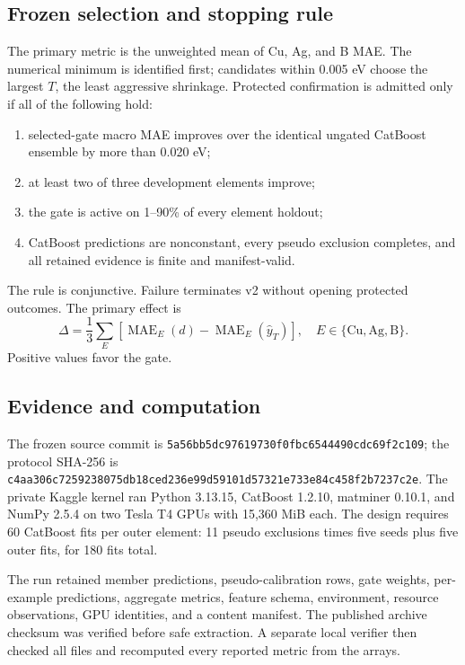 \documentclass[11pt]{article}
\begin{document}
\subsection{Frozen selection and stopping rule}
The primary metric is the unweighted mean of Cu, Ag, and B MAE. The numerical
minimum is identified first; candidates within 0.005 eV choose the largest
$T$, the least aggressive shrinkage. Protected confirmation is admitted only if
all of the following hold:
\begin{enumerate}
  \item selected-gate macro MAE improves over the identical ungated CatBoost
        ensemble by more than 0.020 eV;
  \item at least two of three development elements improve;
  \item the gate is active on 1--90\% of every element holdout;
  \item CatBoost predictions are nonconstant, every pseudo exclusion completes,
        and all retained evidence is finite and manifest-valid.
\end{enumerate}
The rule is conjunctive. Failure terminates v2 without opening protected
outcomes. The primary effect is
\begin{equation}
 \Delta = \frac{1}{3}\sum_E
 \left[\operatorname{MAE}_{E}(d)-\operatorname{MAE}_{E}(\widehat y_T)\right],
 \quad E\in\{\mathrm{Cu},\mathrm{Ag},\mathrm{B}\}.
\end{equation}
Positive values favor the gate.

\subsection{Evidence and computation}
The frozen source commit is
\texttt{5a56bb5d\allowbreak{}c9761973\allowbreak{}0f0fbc65\allowbreak{}44490cdc\allowbreak{}69f2c109}; the protocol SHA-256 is
\texttt{c4aa306c\allowbreak{}72592380\allowbreak{}75db18ce\allowbreak{}d236e99d\allowbreak{}59101d57\allowbreak{}321e733e\allowbreak{}84c458f2\allowbreak{}b7237c2e}.
The private Kaggle kernel ran Python 3.13.15, CatBoost 1.2.10, matminer 0.10.1,
and NumPy 2.5.4 on two Tesla T4 GPUs with 15,360 MiB each. The design requires
60 CatBoost fits per outer element: 11 pseudo exclusions times five seeds plus
five outer fits, for 180 fits total.

The run retained member predictions, pseudo-calibration rows, gate weights,
per-example predictions, aggregate metrics, feature schema, environment,
resource observations, GPU identities, and a content manifest. The published
archive checksum was verified before safe extraction. A separate local verifier
then checked all files and recomputed every reported metric from the arrays.
\end{document}
